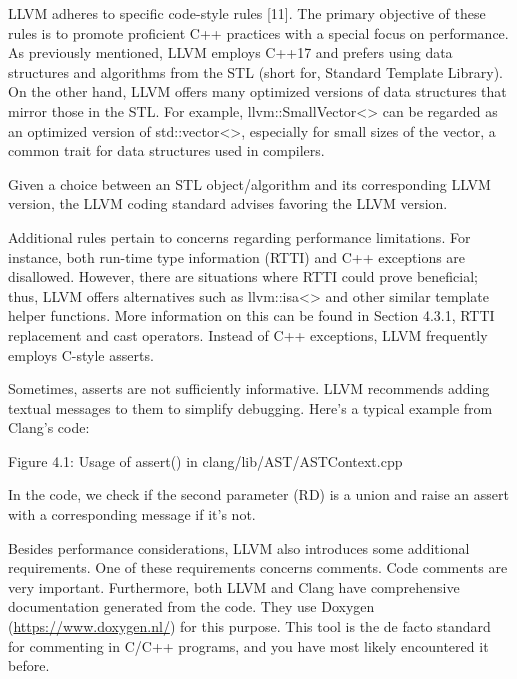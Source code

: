 LLVM adheres to specific code-style rules [11]. The primary objective of these rules is to promote proficient C++ practices with a special focus on performance. As previously mentioned, LLVM employs C++17 and prefers using data structures and algorithms from the STL (short for, Standard Template Library). On the other hand, LLVM offers many optimized versions of data structures that mirror those in the STL. For example, llvm::SmallVector<> can be regarded as an optimized version of std::vector<>, especially for small sizes of the vector, a common trait for data structures used in compilers.

Given a choice between an STL object/algorithm and its corresponding LLVM version, the LLVM coding standard advises favoring the LLVM version.

Additional rules pertain to concerns regarding performance limitations. For instance, both run-time type information (RTTI) and C++ exceptions are disallowed. However, there are situations where RTTI could prove beneficial; thus, LLVM offers alternatives such as llvm::isa<> and other similar template helper functions. More information on this can be found in Section 4.3.1, RTTI replacement and cast operators. Instead of C++ exceptions, LLVM frequently employs C-style asserts.

Sometimes, asserts are not sufficiently informative. LLVM recommends adding textual messages to them to simplify debugging. Here's a typical example from Clang's code:

\begin{cpp}
static bool unionHasUniqueObjectRepresentations(const ASTContext &Context,
  const RecordDecl *RD,
  bool CheckIfTriviallyCopyable) {

    assert(RD->isUnion() && "Must be union type");
    CharUnits UnionSize = Context.getTypeSizeInChars(RD->getTypeForDecl());
\end{cpp}

\begin{center}
Figure 4.1: Usage of assert() in clang/lib/AST/ASTContext.cpp
\end{center}

In the code, we check if the second parameter (RD) is a union and raise an assert with a corresponding message if it's not.

Besides performance considerations, LLVM also introduces some additional requirements. One of these requirements concerns comments. Code comments are very important. Furthermore, both LLVM and Clang have comprehensive documentation generated from the code. They use Doxygen (\url{https://www.doxygen.nl/}) for this purpose. This tool is the de facto standard for commenting in C/C++ programs, and you have most likely encountered it before.

